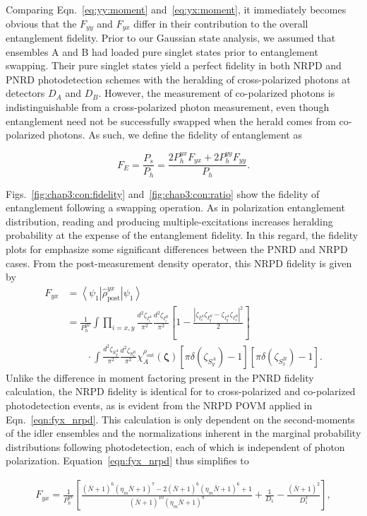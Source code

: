 \documentclass[aps,twocolumn,secnumarabic,amsmath,amssymb,pra,groupedaddress,
showpacs, showkeys,draft]{revtex4-1}
\newcommand{\bra}[1]{\left\langle #1 \right|}
\newcommand{\ket}[1]{\left|#1\right\rangle}
\newcommand{\pna}[1]{\left(#1\right)}
\newcommand{\pnb}[1]{\left[#1\right]}
\newcommand{\eqn}[1]{
\begin{equation}
	#1
\end{equation}
}
\begin{document}
Comparing Eqn.~\ref{eq:yy:moment} and~\ref{eq:yx:moment}, it immediately
becomes obvious that the $F_{yy}$ and $F_{yx}$ differ in their contribution to
the overall entanglement fidelity. Prior to our Gaussian state analysis, we
assumed that ensembles A and B had loaded pure singlet states prior to
entanglement swapping. Their pure singlet states yield a perfect fidelity in
both NRPD and PNRD photodetection schemes with the heralding of cross-polarized
photons at detectors $D_A$ and $D_B$. However, the measurement of co-polarized
photons is indistinguishable from a cross-polarized photon measurement, even
though entanglement need not be successfully swapped when the herald comes from
co-polarized photons. As such, we define the fidelity of entanglement as
\eqn{
F_E = \frac{P_{s}}{P_{h}}=  \frac{2P_{h}^{yx}F_{yx}+2P_{h}^{yy}F_{yy}}{P_{h}}.
}
Figs.~\ref{fig:chap3:con:fidelity} and~\ref{fig:chap3:con:ratio} show the
fidelity of entanglement following a swapping operation. As in polarization
entanglement distribution, reading and producing multiple-excitations increases
heralding probability at the expense of the entanglement fidelity. In this
regard, the fidelity plots for emphasize some significant differences between
the PNRD and NRPD cases. From the post-measurement density operator, this NRPD
fidelity is given by
\begin{align}
F_{yx} & = \bra{\psi_{1}} \hat{\rho}_{\textrm{post}}^{yx} \ket{\psi_1} \nonumber \\
& =\frac{1}{P_{h}^{yx}}\int 
\prod_{i=x,y}
\frac{d^2 \zeta_{I_i^A}}{\pi^2} 
\frac{d^2 \zeta_{I_i^B}}{\pi^2} 
\pnb{1-\frac{|\zeta_{I_x^A}\zeta_{I_y^B}-\zeta_{I_y^A}\zeta_{I_x^B}|^2}{2}}  \nonumber \\
& \qquad \cdot \int 
\frac{d^2 \zeta_{S_y^A}}{\pi^2} 
\frac{d^2 \zeta_{S_x^B}}{\pi^2}
\chi_A^{\rho_{\textrm{out}}}\pna{\bm{\zeta}} 
\pnb{\pi\delta\pna{\zeta_{S_y^A}}-1}\pnb{\pi\delta\pna{\zeta_{S_x^B}}-1}.\label{eqn:fyx_nrpd}
\end{align}
Unlike the difference in moment factoring present in the PNRD fidelity
calculation, the NRPD fidelity is identical for to cross-polarized and
co-polarized photodetection events, as is evident from the NRPD POVM applied in
Eqn.~\ref{eqn:fyx_nrpd}. This calculation is only dependent on the
second-moments of the idler ensembles and the normalizations inherent in the
marginal probability distributions following photodetection, each of which is
independent of photon polarization. Equation~\ref{eqn:fyx_nrpd} thus simplifies
to
\begin{widetext}
\begin{align}
    F_{yx}=\frac{1}{P_{h}^{yx}}\pnb{\frac{(\bar{N}+1)^6 (\eta_{m}
        \bar{N}+1)^7-2 (\bar{N}+1)^6 (\eta_{m}
        \bar{N}+1)^6+1}{(\bar{N}+1)^{10} (\eta_{m}  \bar{N}+1)^9} +\frac{1}{D_1}-\frac{\pna{\bar{N}+1}^2}{D_1^3}},
\end{align}
\end{widetext}
\end{document}
